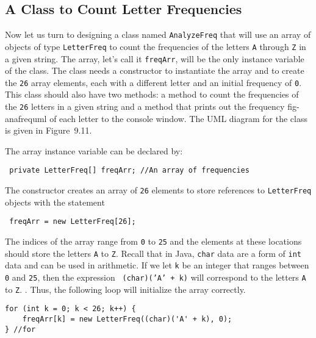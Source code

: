 \subsection{A Class to Count Letter Frequencies}

\noindent Now let us turn to designing a class named {\tt AnalyzeFreq}
that will use an array of objects of type {\tt LetterFreq} to count
the frequencies of the letters {\tt A} through {\tt Z} in a given
string.  The array, let's call it {\tt freqArr}, will be the only
instance variable of the class.  The class needs a constructor to
instantiate the array and to create the {\tt 26} array elements, each
with a different letter and an initial frequency of {\tt 0}.  This
class should also have two methods: a method to count the frequencies
of the {\tt 26} letters in a given string and a method that prints out
the frequency 
{fig-anafrequml}
of each letter to the console window.  The UML diagram for the class
is given in Figure~9.11.

The array instance variable can be declared by:

\begin{jjjlisting}
\begin{lstlisting}
 private LetterFreq[] freqArr; //An array of frequencies
\end{lstlisting}
\end{jjjlisting}

\noindent The constructor creates an array of {\tt 26} elements to
store references to {\tt LetterFreq} objects with the statement

\begin{jjjlisting}
\begin{lstlisting}
 freqArr = new LetterFreq[26];
\end{lstlisting}
\end{jjjlisting}

\noindent The indices of the array range from {\tt 0} to {\tt 25} and
the elements at these locations should store the letters {\tt A} to
{\tt Z}.  Recall that in Java, {\tt char} data are a form of {\tt int}
data and can be used in arithmetic.  If we let {\tt k} be an integer
that ranges between {\tt 0} and {\tt 25}, then the expression {\tt
(char)('A' + k)} will correspond to the letters {\tt A} to {\tt Z}.  .
Thus, the following loop will initialize the array correctly.  

\begin{jjjlisting}
\begin{lstlisting}
for (int k = 0; k < 26; k++) {
    freqArr[k] = new LetterFreq((char)('A' + k), 0);
} //for
\end{lstlisting}
\end{jjjlisting}

